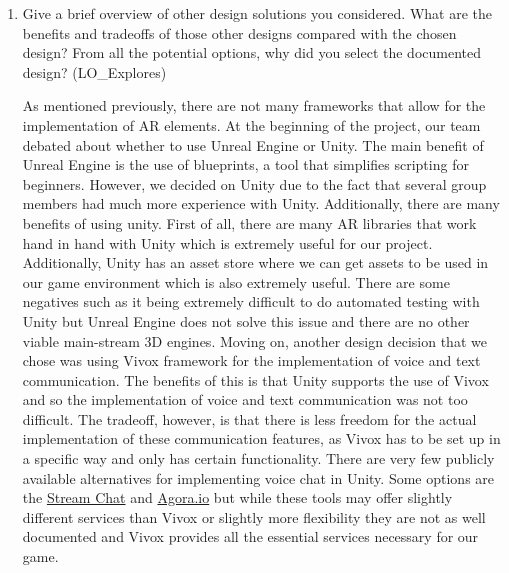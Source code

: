 \documentclass[12pt, titlepage]{article}
\begin{document}
\begin{enumerate}
  \item Give a brief overview of other design solutions you considered.  What
  are the benefits and tradeoffs of those other designs compared with the chosen
  design?  From all the potential options, why did you select the documented design?
  (LO\_Explores)

As mentioned previously, there are not many frameworks that allow for the implementation of AR elements. At the beginning of the project, our team debated about whether to use Unreal Engine or Unity. The main benefit of Unreal Engine is the use of blueprints, a tool that simplifies scripting for beginners. However, we decided on Unity due to the fact that several group members had much more experience with Unity. Additionally, there are many benefits of using unity. First of all, there are many AR libraries that work hand in hand with Unity which is extremely useful for our project. Additionally, Unity has an asset store where we can get assets to be used in our game environment which is also extremely useful. There are some negatives such as it being extremely difficult to do automated testing with Unity but Unreal Engine does not solve this issue and there are no other viable main-stream 3D engines. Moving on, another design decision that we chose was using Vivox framework for the implementation of voice and text communication. The benefits of this is that Unity supports the use of Vivox and so the implementation of voice and text communication was not too difficult. The tradeoff, however, is that there is less freedom for the actual implementation of these communication features, as Vivox has to be set up in a specific way and only has certain functionality. There are very few publicly available alternatives for implementing voice chat in Unity. Some options are the \hyperlink{https://getstream.io/chat/docs/unity/?language=unity}{Stream Chat} and \hyperlink{https://www.agora.io/en/adding-voice-chat-to-a-multiplayer-cross-platform-unity-game/}{Agora.io} but while these tools may offer slightly different services than Vivox or slightly more flexibility they are not as well documented and Vivox provides all the essential services necessary for our game.
\end{enumerate}
\end{document}
